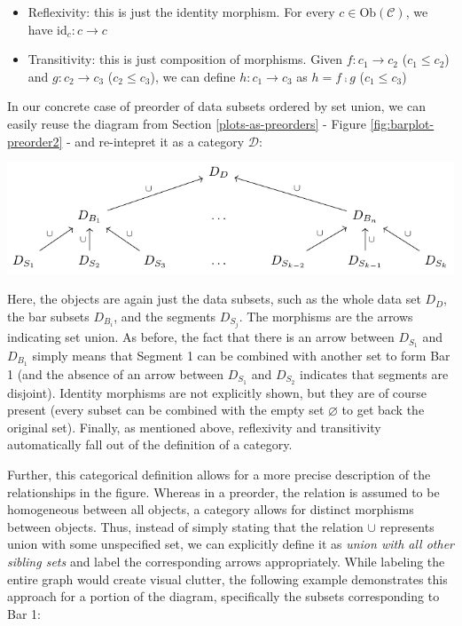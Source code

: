 \documentclass[
]{book}
\providecommand{\tightlist}{%
  \setlength{\itemsep}{0pt}\setlength{\parskip}{0pt}}
\theoremstyle{definition}
\theoremstyle{definition}
\theoremstyle{definition}
\theoremstyle{definition}
\theoremstyle{remark}
\begin{document}
\begin{itemize}
\tightlist
\item
  Reflexivity: this is just the identity morphism. For every \(c \in \text{Ob}(\mathcal{C})\), we have \(\text{id}_c : c \to c\)
\item
  Transitivity: this is just composition of morphisms. Given \(f: c_1 \to c_2\) (\(c_1 \leq c_2\)) and \(g: c_2 \to c_3\) (\(c_2 \leq c_3\)), we can define \(h: c_1 \to c_3\) as \(h = f ⨾g\) (\(c_1 \leq c_3\))
\end{itemize}

In our concrete case of preorder of data subsets ordered by set union, we can easily reuse the diagram from Section \ref{plots-as-preorders} - Figure \ref{fig:barplot-preorder2} - and re-intepret it as a category \(\mathcal{D}\):

\begin{center}\includegraphics[width=1\linewidth,height=1\textheight]{./figures/barplot-preorder2} \end{center}

Here, the objects are again just the data subsets, such as the whole data set \(D_D\), the bar subsets \(D_{B_i}\), and the segments \(D_{S_j}\). The morphisms are the arrows indicating set union. As before, the fact that there is an arrow between \(D_{S_1}\) and \(D_{B_1}\) simply means that Segment 1 can be combined with another set to form Bar 1 (and the absence of an arrow between \(D_{S_1}\) and \(D_{S_2}\) indicates that segments are disjoint). Identity morphisms are not explicitly shown, but they are of course present (every subset can be combined with the empty set \(\varnothing\) to get back the original set). Finally, as mentioned above, reflexivity and transitivity automatically fall out of the definition of a category.

Further, this categorical definition allows for a more precise description of the relationships in the figure. Whereas in a preorder, the relation is assumed to be homogeneous between all objects, a category allows for distinct morphisms between objects. Thus, instead of simply stating that the relation \(\cup\) represents union with some unspecified set, we can explicitly define it as \emph{union with all other sibling sets} and label the corresponding arrows appropriately. While labeling the entire graph would create visual clutter, the following example demonstrates this approach for a portion of the diagram, specifically the subsets corresponding to Bar 1:
\end{document}

